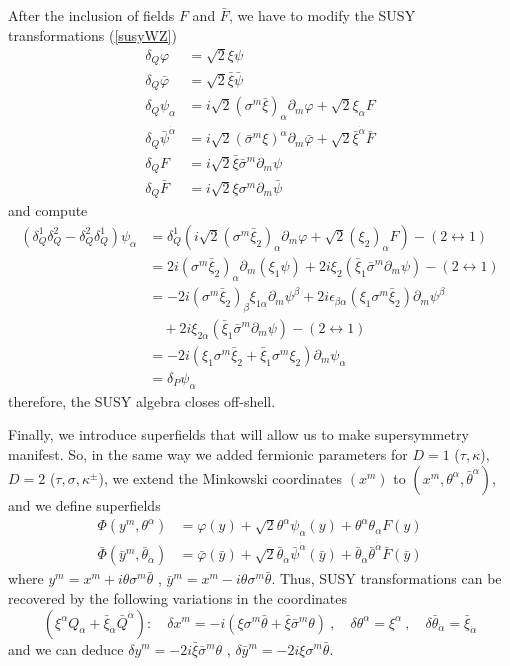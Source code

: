 \documentclass[a4paper,12pt]{article}
\numberwithin{equation}{section}
\numberwithin{exe}{section}
\newcommand{\p}{{\partial}}
\newcommand{\yb}{{\bar y}}
\newcommand{\lra}{\leftrightarrow}
\newcommand{\Fb}{{\bar F}}
\renewcommand{\a}{{\alpha}}
\newcommand{\ad}{{\dot\alpha}}
\renewcommand{\b}{{\beta}}
\renewcommand{\d}{{\delta}}
\newcommand{\e}{{\epsilon}}
\renewcommand{\k}{{\kappa}}
\newcommand{\s}{{\sigma}}
\renewcommand{\sb}{{\bar\sigma}}
\renewcommand{\t}{{\theta}}
\newcommand{\tb}{{\bar\theta}}
\newcommand{\vphi}{{\varphi}}
\newcommand{\vphib}{{\bar\varphi}}
\newcommand{\xib}{{\bar\xi}}
\newcommand{\Phib}{{\bar \Phi}}
\newcommand{\psib}{{\bar\psi}}
\begin{document}
After the inclusion of fields $F$ and $\Fb$, we have to modify the SUSY transformations (\ref{susyWZ})
	\begin{equation}\label{star2}
		\begin{aligned}
		\d_Q\vphi & = \sqrt2 \xi \psi \\
		\d_Q\vphib & = \sqrt2 \xib \psib \\
		\d_Q\psi_\a & = i\sqrt2(\s^m\xib)_\a\p_m\vphi + \sqrt2 \xi_\a F  \\
		\d_Q\psib^\ad & = i\sqrt2(\sb^m\xi)^\ad\p_m\vphib + \sqrt2 \xib^\ad \bar F \\
		\d_Q F & = i\sqrt2 \xib\sb^m\p_m\psi \\
		\d_Q \bar F & = i\sqrt2 \xi\s^m\p_m \psib
		\end{aligned}
	\end{equation}
and compute
	\begin{align}
	(\d^1_Q \d^2_Q - \d^2_Q \d^1_Q)\psi_\a & = \d^1_Q \left(i\sqrt2 (\s^m\xib_2)_\a \p_m\vphi + \sqrt2 (\xi_2)_\a F\right) - (2\lra 1) \nonumber \\
	& = 2i(\s^m\xib_2)_\a \p_m (\xi_1\psi) + 2i \xi_2 (\xib_1\sb^m \p_m \psi) - (2\lra 1) \nonumber \\
	& = -2i(\s^m\xib_2)_\b \xi_{1\a}\p_m\psi^\b + 2i\e_{\b\a} (\xi_1 \s^m\xib_2) \p_m\psi^\b \nonumber \\
	&\quad + 2i \xi_{2\a}(\xib_1 \sb^m \p_m\psi) - (2\lra 1) \nonumber \\
	& = -2i(\xi_1 \s^m \xib_2 + \xib_1 \s^m \xi_2) \p_m\psi_\a \nonumber \\
	& = \d_P \psi_\a
	\end{align}
therefore, the SUSY algebra closes off-shell.

Finally, we introduce superfields that will allow us to make supersymmetry manifest. So, in the same way we added fermionic parameters for $D=1$ ($\tau,\k$), $D=2$ ($\tau,\s,\k^\pm$), we extend the Minkowski coordinates $(x^m)$ to $(x^m,\t^\a,\tb^\ad)$, and we define superfields
	\begin{equation}
		\begin{aligned}
		\Phi(y^m,\t^\a) & = \vphi(y) + \sqrt2 \t^\a \psi_\a(y) + \t^\a \t_\a F(y) \\
		\Phib(\yb^m,\tb_\ad) & = \vphib(\yb) + \sqrt2 \tb_\ad \psib^\ad(\yb) + \tb_\ad \tb^\ad \bar F(\yb)
		\end{aligned}
	\end{equation}
where $y^m = x^m + i\t\s^m \tb$ , $\yb^m = x^m - i \t\s^m\tb$. Thus, SUSY transformations can be recovered by the following variations in the coordinates
	\begin{equation}
	(\xi^\a Q_\a + \xib_\ad \bar Q^\ad) :\quad \d x^m = -i(\xi\s^m\tb + \xib\sb^m\t)\ ,\quad \d\t^\a = \xi^\a\ ,\quad \d \tb_\ad = \xib_\ad
	\end{equation}
and we can deduce $\d y^m = -2i \xib\sb^m \t$ , $\d\yb^m = -2i \xi\s^m\tb$.
	
\end{document}
